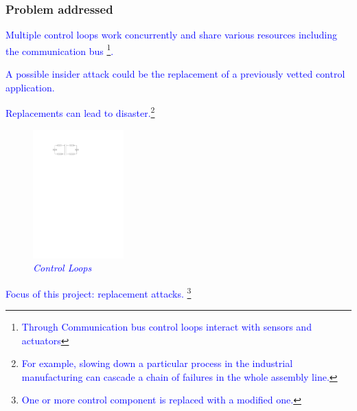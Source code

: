 \begin{frame}
\frametitle{Problem addressed}
\itemize
\item \tiny{\textcolor{blue}{Multiple control loops work
concurrently and share various resources including the communication
bus \footnote{\tiny{\textcolor{blue}{Through Communication bus control loops interact with sensors and actuators}}}.}} 

\item \tiny{\textcolor{blue}{A possible insider attack could be the replacement of a previously
vetted control application. }}

\item \tiny{\textcolor{blue}{ Replacements can lead to disaster.\footnote{\tiny{\textcolor{blue}{ For example, slowing down a
particular process in the industrial manufacturing can cascade 
a chain of failures in the whole
assembly line.}}}}}
\begin{figure}
\begin{center}
\includegraphics[width=35mm]{control_diagram.pdf}
\end{center}
\caption{{\em \tiny{\textcolor{blue}{Control Loops}}}} \label{fig1}
\end{figure}

\item \tiny{\textcolor{blue}{Focus of this project: replacement attacks.
\footnote{\tiny{\textcolor{blue} {One or more 
control component is replaced with a modified one.}}}}}





\end{frame}
